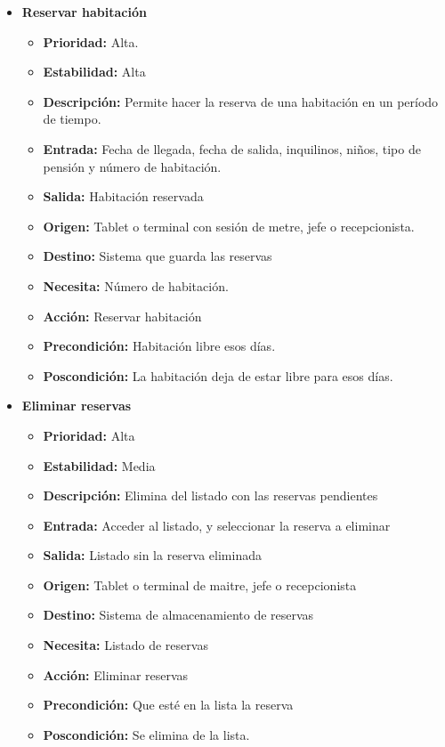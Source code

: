\documentclass[spanish,a4paper,11pt, twoside]{report}	%
\begin{document}
\begin{itemize}
\begin{itemize}
		\end{itemize}%

		\item \textbf{Reservar habitación} 

		\begin{itemize}

			\item \textbf{Prioridad: } Alta.
			\item \textbf{Estabilidad: }Alta
			\item \textbf{Descripción: }Permite hacer la reserva de una habitación en un período de tiempo.
			\item \textbf{Entrada: } Fecha de llegada, fecha de salida, inquilinos, niños, tipo de pensión y número de habitación.
			\item \textbf{Salida: } Habitación reservada
			\item \textbf{Origen: } Tablet o terminal con sesión de metre, jefe o recepcionista.
			\item \textbf{Destino: } Sistema que guarda las reservas
			\item \textbf{Necesita: } Número de habitación.
			\item \textbf{Acción: } Reservar habitación
			\item \textbf{Precondición: } Habitación libre esos días.
			\item \textbf{Poscondición: } La habitación deja de estar libre para esos días.

		\end{itemize}%
		\item \textbf{ Eliminar reservas} 

		\begin{itemize}

			\item \textbf{Prioridad: }Alta
			\item \textbf{Estabilidad: }Media
			\item \textbf{Descripción: }Elimina del listado con las reservas pendientes
			\item \textbf{Entrada: }Acceder al listado, y seleccionar la reserva a eliminar
			\item \textbf{Salida: }Listado sin la reserva eliminada
			\item \textbf{Origen: }Tablet o terminal de maitre, jefe o recepcionista
			\item \textbf{Destino: }Sistema de almacenamiento de reservas
			\item \textbf{Necesita: } Listado de reservas
			\item \textbf{Acción: }Eliminar reservas
			\item \textbf{Precondición: }Que esté en la lista la reserva
			\item \textbf{Poscondición: } Se elimina de la lista.


\end{itemize}
\end{itemize}
\end{document}
